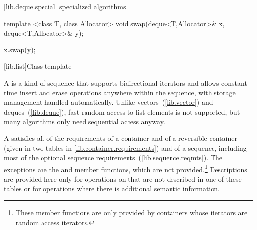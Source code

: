 [lib.deque.special]{ specialized algorithms}

%
%
\begin{itemdecl}
template <class T, class Allocator>
  void swap(deque<T,Allocator>& x, deque<T,Allocator>& y);
\end{itemdecl}

\begin{itemdescr}
\pnum
\effects
\begin{codeblock}
    x.swap(y);
\end{codeblock}
\end{itemdescr}

[lib.list]{Class template }

\pnum
{}%
A
is a kind of sequence that supports
bidirectional iterators and allows constant time insert and erase
operations anywhere within the sequence, with storage management handled
automatically. Unlike vectors~(\ref{lib.vector}) and deques~(\ref{lib.deque}),
fast random access to list elements is not supported, but many
algorithms only need sequential access anyway.

\pnum
A  satisfies all of the requirements of a container and of
a reversible container (given in two tables in
\ref{lib.container.requirements}) and of a sequence,
including most of the optional sequence
requirements~(\ref{lib.sequence.reqmts}).
The exceptions are the
and
member functions, which are not provided.\footnote{These member functions
are only provided by containers whose iterators
are random access iterators.
}
Descriptions are provided here only for operations on
that are not described in one of these tables
or for operations where there is additional semantic information.

